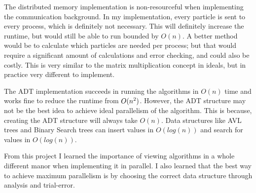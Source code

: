 \documentclass[12pt,a4paper]{article}
\begin{document}
The distributed memory implementation is non-resourceful when implementing the communication background. In my implementation, every particle is sent to every process, which is definitely not necessary. This will definitely increase the runtime, but would still be able to run bounded by $O(n)$. A better method would be to calculate which particles are needed per process; but that would require a significant amount of calculations and error checking, and could also be costly. This is very similar to the matrix multiplication concept in ideals, but in practice very different to implement.  

The ADT implementation succeeds in running the algorithms in $O(n)$ time and works fine to reduce the runtime from $O(n\textsuperscript{2})$. However, the ADT structure may not be the best idea to achieve ideal parallelism of the algorithm. This is because, creating the ADT structure will always take $O(n)$. Data structures like AVL trees and Binary Search trees can insert values in $O(log(n))$ and search for values in $O(log(n))$. 

From this project I learned the importance of viewing algorithms in a whole different manor when implementing it in parallel. I also learned that the best way to achieve maximum parallelism is by choosing the correct data structure through analysis and trial-error.  


\appendix
\end{document}
